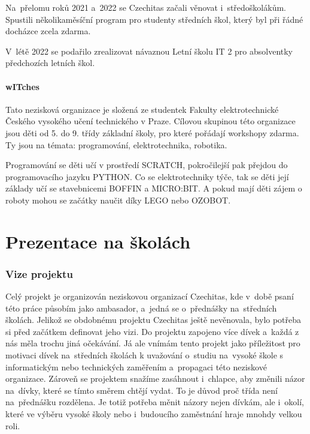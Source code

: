 \documentclass[12pt]{report}			%
\begin{document}
                Na~přelomu roků 2021 a~2022 se Czechitas začali věnovat i~středoškolákům. Spustili několikaměsíční program pro studenty středních škol, který byl při řádné docházce zcela zdarma.\cite{CzechitasOvladniDigitalniTechnologie}
                
                V~létě 2022 se podařilo zrealizovat návaznou Letní školu IT 2 pro absolventky předchozích letních škol.\cite{Czechitas2022}


            \subsection {wITches}
                Tato nezisková organizace je složená ze studentek Fakulty elektrotechnické Českého vysokého učení technického v Praze. Cílovou skupinou této organizace jsou děti od 5. do 9. třídy základní školy, pro které pořádají workshopy zdarma. Ty jsou na témata: programování, elektrotechnika, robotika. 

                Programování se děti učí v prostředí SCRATCH, pokročilejší pak přejdou do programovacího jazyku PYTHON. Co se elektrotechniky týče, tak se děti její základy učí se stavebnicemi BOFFIN a MICRO:BIT. A pokud mají děti zájem o roboty mohou se začátky naučit díky LEGO nebo OZOBOT.
	
\part{Prezentace na školách}

        \section{Vize projektu}
    
            Celý projekt je organizován neziskovou organizací Czechitas, kde v~době psaní této práce působím jako ambasador, a~jedná se o~přednášky na~středních školách. Jelikož se obdobnému projektu Czechitas ještě nevěnovala, bylo potřeba si před začátkem definovat jeho vizi. Do projektu zapojeno více dívek a~každá z nás měla trochu jiná očekávání. Já ale vnímám tento projekt jako příležitost pro motivaci dívek na~středních školách k uvažování o~studiu na~vysoké škole s informatickým nebo technických zaměřením a~propagaci této neziskové organizace. Zároveň se projektem snažíme zasáhnout i~chlapce, aby změnili názor na~dívky, které se tímto směrem chtějí vydat. To je důvod proč třída není na~přednášku rozdělena. Je totiž potřeba měnit názory nejen dívkám, ale i~okolí, které ve výběru vysoké školy nebo i~budoucího zaměstnání hraje mnohdy velkou roli.
        
\end{document}
